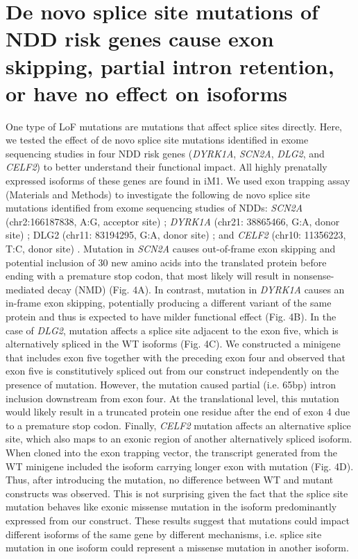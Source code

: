 \documentclass[12pt,chapterheads,final]{ucsd}
\begin{document}
\section{De novo splice site mutations of NDD risk genes cause exon skipping, partial intron retention, or have no effect on isoforms}
One type of LoF mutations are mutations that affect splice sites directly. Here, we tested the effect of de novo splice site mutations identified in exome sequencing studies in four NDD risk genes (\textit{DYRK1A}, \textit{SCN2A}, \textit{DLG2}, and \textit{CELF2}) to better understand their functional impact. All highly prenatally expressed isoforms of these genes are found in iM1. We used exon trapping assay (Materials and Methods) to investigate the following de novo splice site mutations identified from exome sequencing studies of NDDs: \textit{SCN2A} (chr2:166187838, A:G, acceptor site) \cite{Fromer2014}; \textit{DYRK1A} (chr21: 38865466, G:A, donor site) \cite{ORoak2012}; DLG2 (chr11: 83194295, G:A, donor site) \cite{Fromer2014}; and \textit{CELF2} (chr10: 11356223, T:C, donor site) \cite{Xu2011}. Mutation in \textit{SCN2A} causes out-of-frame exon skipping and potential inclusion of 30 new amino acids into the translated protein before ending with a premature stop codon, that most likely will result in nonsense-mediated decay (NMD) (Fig. 4A). In contrast, mutation in \textit{DYRK1A} causes an in-frame exon skipping, potentially producing a different variant of the same protein and thus is expected to have milder functional effect (Fig. 4B). In the case of \textit{DLG2}, mutation affects a splice site adjacent to the exon five, which is alternatively spliced in the WT isoforms (Fig. 4C). We constructed a minigene that includes exon five together with the preceding exon four and observed that exon five is constitutively spliced out from our construct independently on the presence of mutation. However, the mutation caused partial (i.e. 65bp) intron inclusion downstream from exon four. At the translational level, this mutation would likely result in a truncated protein one residue after the end of exon 4 due to a premature stop codon. Finally, \textit{CELF2} mutation affects an alternative splice site, which also maps to an exonic region of another alternatively spliced isoform. When cloned into the exon trapping vector, the transcript generated from the WT minigene included the isoform carrying longer exon with mutation (Fig. 4D). Thus, after introducing the mutation, no difference between WT and mutant constructs was observed. This is not surprising given the fact that the splice site mutation behaves like exonic missense mutation in the isoform predominantly expressed from our construct. These results suggest that mutations could impact different isoforms of the same gene by different mechanisms, i.e. splice site mutation in one isoform could represent a missense mutation in another isoform. \par
\end{document}

